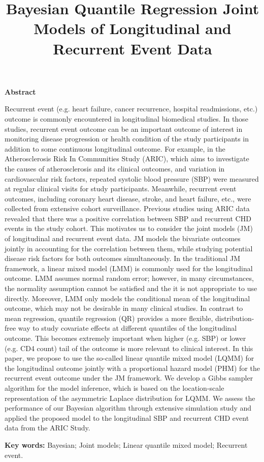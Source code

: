 
\title{Bayesian Quantile Regression Joint Models of Longitudinal and Recurrent Event Data}

\author{}
\date{}

\maketitle


\begin{center}
{\bf Abstract}
\end{center}

Recurrent event (e.g. heart failure, cancer recurrence, hospital readmissions, etc.) outcome is commonly encountered in longitudinal biomedical studies. In those studies, recurrent event outcome can be an important outcome of interest in monitoring disease progression or health condition of the study participants in addition to some continuous longitudinal outcome. For example, in the Atherosclerosis Risk In Communities Study (ARIC), which aims to investigate the causes of atherosclerosis and its clinical outcomes, and variation in cardiovascular risk factors, repeated systolic blood pressure (SBP) were measured at regular clinical visits for study participants. Meanwhile, recurrent event outcomes, including coronary heart disease, stroke, and heart failure, etc., were collected from extensive cohort surveillance. Previous studies using ARIC data revealed that there was a positive correlation between SBP and recurrent CHD events in the study cohort. This motivates us to consider the joint models (JM) of longitudinal and recurrent event data. JM models the bivariate outcomes jointly in accounting for the correlation between them, while studying potential disease risk factors for both outcomes simultaneously. In the traditional JM framework, a linear mixed model (LMM) is commonly used for the longitudinal outcome. LMM assumes normal random error; however, in many circumstances, the normality assumption cannot be satisfied and the it is not appropriate to use directly. Moreover, LMM only models the conditional mean of the longitudinal outcome, which may not be desirable in many clinical studies. In contrast to mean regression, quantile regression (QR) provides a more flexible, distribution-free way to study covariate effects at different quantiles of the longitudinal outcome. This becomes extremely important when higher (e.g. SBP) or lower (e.g. CD4 count) tail of the outcome is more relevant to clinical interest. In this paper, we propose to use the so-called linear quantile mixed model (LQMM) for the longitudinal outcome jointly with a proportional hazard model (PHM) for the recurrent event outcome under the JM framework. We develop a Gibbs sampler algorithm for the model inference, which is based on the location-scale representation of the asymmetric Laplace distribution for LQMM. We assess the performance of our Bayesian algorithm through extensive simulation study and applied the proposed model to the longitudinal SBP and recurrent CHD event data from the ARIC Study.

{\bf Key words:} Bayesian; Joint models; Linear quantile mixed model; Recurrent event.

